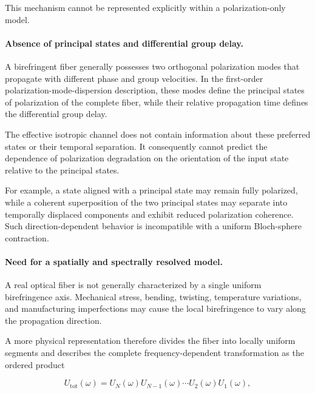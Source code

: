 This mechanism cannot be represented explicitly within a polarization-only model.

\medskip

\paragraph{Absence of principal states and differential group delay.}

A birefringent fiber generally possesses two orthogonal polarization modes that propagate with different phase and group velocities. In the first-order polarization-mode-dispersion description, these modes define the principal states of polarization of the complete fiber, while their relative propagation time defines the differential group delay.

\medskip

The effective isotropic channel does not contain information about these preferred states or their temporal separation. It consequently cannot predict the dependence of polarization degradation on the orientation of the input state relative to the principal states.

For example, a state aligned with a principal state may remain fully polarized, while a coherent superposition of the two principal states may separate into temporally displaced components and exhibit reduced polarization coherence. Such direction-dependent behavior is incompatible with a uniform Bloch-sphere contraction.

\medskip

\paragraph{Need for a spatially and spectrally resolved model.}

A real optical fiber is not generally characterized by a single uniform birefringence axis. Mechanical stress, bending, twisting, temperature variations, and manufacturing imperfections may cause the local birefringence to vary along the propagation direction.

A more physical representation therefore divides the fiber into locally uniform segments and describes the complete frequency-dependent transformation as the ordered product

\begin{equation}
U_{\mathrm{tot}}(\omega)
=
U_N(\omega)
U_{N-1}(\omega)
\cdots
U_2(\omega)
U_1(\omega),
\label{eq:concatenated_model_transition_ch5}
\end{equation}

